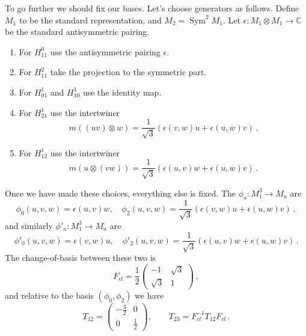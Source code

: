 \documentclass[12pt,letterpaper,reqno]{amsart}
\numberwithin{equation}{section}
\newcommand{\bbC}{\ensuremath{\mathbb C}}
\newcommand{\eps}{\epsilon}
\DeclareMathOperator{\Sym}{Sym}
\begin{document}
\begin{example}
To go further we should fix our bases. Let's choose generators as
follows. Define $M_1$ to be the standard representation, 
and $M_2 = \Sym^2 M_1$.
Let $\eps: M_1 \otimes M_1 \to \bbC$ be the standard
antisymmetric pairing.
\begin{enumerate}
  \item For $H^0_{11}$ use the antisymmetric pairing $\eps$.
  \item For $H^2_{11}$ take the projection to the symmetric part.
  \item For $H^1_{01}$ and $H^1_{10}$ use the identity map.
  \item For $H^1_{21}$ use the intertwiner
  \begin{equation}
    m((uv) \otimes w) = \frac{1}{\sqrt3} (\eps(v,w) u + \eps(u,w) v) \, . 
  \end{equation}
  \item For $H^1_{12}$ use the intertwiner
  \begin{equation}
    m(u \otimes (vw)) = \frac{1}{\sqrt3} (\eps(u,v) w + \eps(u,w) v) \, . 
  \end{equation}
\end{enumerate}
Once we have made these choices, everything else is fixed.
The $\phi_a: M_1^3 \to M_a$ are
\begin{equation}
  \phi_0(u,v,w) = \eps(u,v) w, \quad \phi_2(u,v,w) = \frac{1}{\sqrt3} (\eps(v,w) u + \eps(u,w) v) \, ,
\end{equation}
and similarly $\phi'_a: M_1^3 \to M_a$ are
\begin{equation}
  \phi'_0(u,v,w) = \eps(v,w) u, \quad \phi'_2(u,v,w) = \frac{1}{\sqrt3} (\eps(u,v) w + \eps(u,w) v) \, .
\end{equation}
The change-of-basis between these two is
\begin{equation} \label{eq:F-classical}
  F_{cl} = \frac12 \begin{pmatrix} -1 & \sqrt3 \\ \sqrt3 & 1 \end{pmatrix} \, ,
\end{equation}
and relative to the basis $(\phi_0, \phi_2)$ we have
\begin{equation}
  T_{12} = \begin{pmatrix} - \frac32 & 0 \\ 0 & \frac12 \end{pmatrix}, \qquad T_{23} = F_{cl}^{-1} T_{12} F_{cl} \, .
\end{equation}


\end{example}
\end{document}
